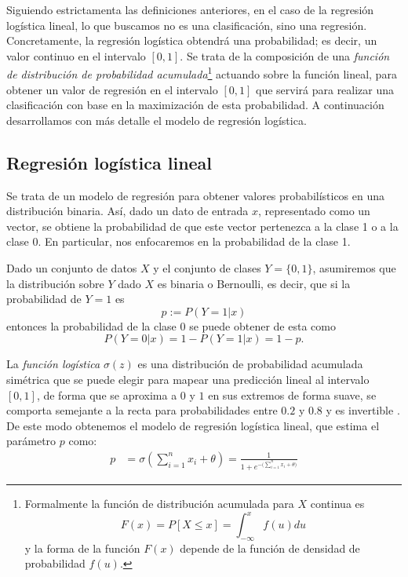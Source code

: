 Siguiendo estrictamenta las definiciones anteriores, en el caso de la regresión logística lineal, lo que buscamos no es una clasificación, sino una regresión. Concretamente, la regresión logística obtendrá una probabilidad; es decir, un valor continuo en el intervalo $[0,1]$.  Se trata de la composición de una \emph{función de distribución de probabilidad acumulada}\footnote{Formalmente la función de distribución acumulada para $X$ continua es $$F(x) = P[X \leq x] =\int_{-\infty}^{x} f(u) du$$ y la forma de la función $F(x)$ depende de la función de densidad de probabilidad $f(u)$.} actuando sobre la función lineal, para obtener un valor de regresión en el intervalo $[0,1]$ que servirá para realizar una clasificación con base en la maximización de esta probabilidad. A continuación desarrollamos con más detalle el modelo de regresión logística.


\subsection{Regresión logística lineal}

Se trata de un modelo de regresión para obtener valores probabilísticos en una distribución binaria. Así, dado un dato de entrada $x$, representado como un vector, se obtiene la probabilidad de que este vector pertenezca a la clase 1 o a la clase 0. En particular, nos enfocaremos en la probabilidad de la clase 1.

Dado un conjunto de datos $X$ y el conjunto de clases $Y = \{0,1\}$, asumiremos que la distribución sobre $Y$ dado $X$ es binaria o Bernoulli, es decir, que si la probabilidad de $Y=1$ es $$p := P(Y=1|x)$$ entonces la probabilidad de la clase 0 se puede obtener de esta como $$P(Y=0|x) = 1-P(Y=1|x) = 1-p.$$




La \emph{función logística} $\sigma(z)$ es una distribución de probabilidad acumulada simétrica que se puede elegir para mapear una predicción lineal al intervalo $[0,1]$, de forma que se aproxima a $0$ y $1$ en sus extremos de forma suave, se comporta semejante a la recta para probabilidades entre $0.2$ y $0.8$ y es invertible \parencite{Fox2016}.  De este modo obtenemos el modelo de regresión logística lineal, que estima el parámetro $p$ como:
\begin{align*}
 p &= \sigma \left(\sum_{i=1}^n x_i + \theta \right) = \frac{1}{1 + e^{-\big(\sum_{i=1}^n x_i + \theta\big)}}
\end{align*}

